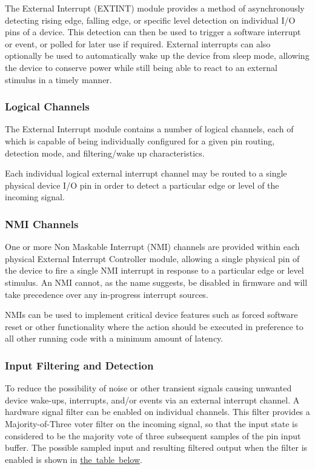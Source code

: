 The External Interrupt (E\+X\+T\+I\+NT) module provides a method of asynchronously detecting rising edge, falling edge, or specific level detection on individual I/O pins of a device. This detection can then be used to trigger a software interrupt or event, or polled for later use if required. External interrupts can also optionally be used to automatically wake up the device from sleep mode, allowing the device to conserve power while still being able to react to an external stimulus in a timely manner.\hypertarget{group__asfdoc__sam0__extint__group_asfdoc_sam0_extint_logical_channels}{}\subsubsection{Logical Channels}\label{group__asfdoc__sam0__extint__group_asfdoc_sam0_extint_logical_channels}
The External Interrupt module contains a number of logical channels, each of which is capable of being individually configured for a given pin routing, detection mode, and filtering/wake up characteristics.

Each individual logical external interrupt channel may be routed to a single physical device I/O pin in order to detect a particular edge or level of the incoming signal.\hypertarget{group__asfdoc__sam0__extint__group_asfdoc_sam0_extint_module_overview_nmi_chanel}{}\subsubsection{N\+M\+I Channels}\label{group__asfdoc__sam0__extint__group_asfdoc_sam0_extint_module_overview_nmi_chanel}
One or more Non Maskable Interrupt (N\+MI) channels are provided within each physical External Interrupt Controller module, allowing a single physical pin of the device to fire a single N\+MI interrupt in response to a particular edge or level stimulus. An N\+MI cannot, as the name suggests, be disabled in firmware and will take precedence over any in-\/progress interrupt sources.

N\+M\+Is can be used to implement critical device features such as forced software reset or other functionality where the action should be executed in preference to all other running code with a minimum amount of latency.\hypertarget{group__asfdoc__sam0__extint__group_asfdoc_sam0_extint_module_overview_filtering}{}\subsubsection{Input Filtering and Detection}\label{group__asfdoc__sam0__extint__group_asfdoc_sam0_extint_module_overview_filtering}
To reduce the possibility of noise or other transient signals causing unwanted device wake-\/ups, interrupts, and/or events via an external interrupt channel. A hardware signal filter can be enabled on individual channels. This filter provides a Majority-\/of-\/\+Three voter filter on the incoming signal, so that the input state is considered to be the majority vote of three subsequent samples of the pin input buffer. The possible sampled input and resulting filtered output when the filter is enabled is shown in \mbox{\hyperlink{group__asfdoc__sam0__extint__group_asfdoc_sam0_extint_filter_table}{the table below}}.


